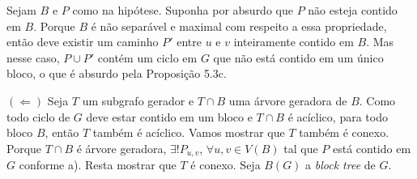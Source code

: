 
 Sejam $B$ e $P$ como na hipótese. Suponha por absurdo que $P$ não
esteja contido em $B$. Porque $B$ é não separável e maximal com respeito a essa
propriedade, então deve existir um caminho $P'$ entre $u$ e $v$ inteiramente
contido em $B$. Mas nesse caso, $P \cup P'$ contém um ciclo em $G$ que não está
contido em um único bloco, o que é absurdo pela Proposição 5.3c.

$(\Leftarrow)$ Seja $T$ um subgrafo gerador e $T \cap B$ uma árvore geradora de
$B$. Como todo ciclo de $G$ deve estar contido em um bloco e $T \cap B$ é
acíclico, para todo bloco $B$, então $T$ também é acíclico. Vamos mostrar que
$T$ também é conexo. Porque $T \cap B$ é árvore geradora, $\exists!P_{u,v}$,
$\forall u,v \in V(B)$ tal que $P$ está contido em $G$ conforme a). Resta
mostrar que $T$ é conexo. Seja $B(G)$ a \emph{block tree} de $G$. %

